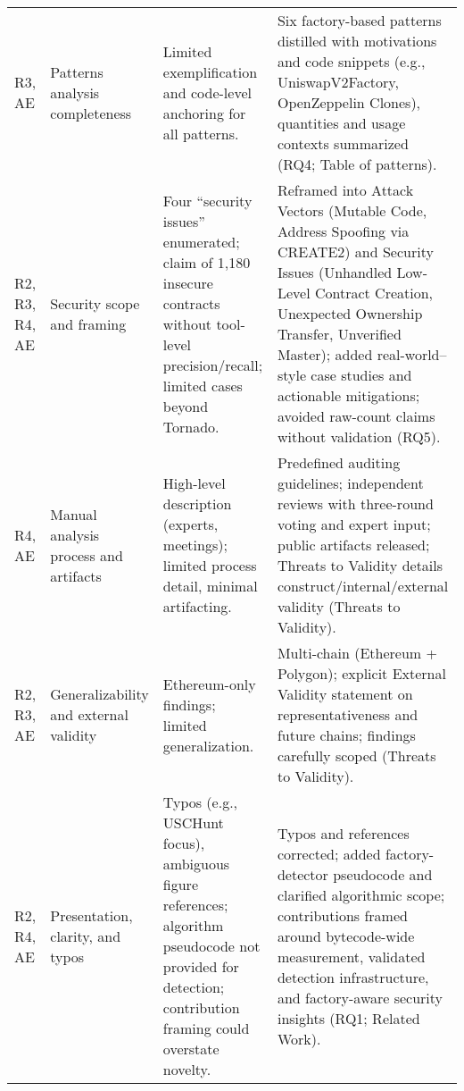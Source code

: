 \begin{table*}
\begin{tabular}{@{}p{1.6cm} p{2cm} p{3.8cm} p{5.5cm}@{}}
		R3, AE                  & Patterns analysis completeness          & Limited exemplification and code-level anchoring for all patterns.                                                                                       & Six factory-based patterns distilled with motivations and code snippets (e.g., UniswapV2Factory, OpenZeppelin Clones), quantities and usage contexts summarized (RQ4; Table of patterns).                                                                                                                   \\
		R2, R3, R4, AE          & Security scope and framing              & Four “security issues” enumerated; claim of 1,180 insecure contracts without tool-level precision/recall; limited cases beyond Tornado.                  & Reframed into Attack Vectors (Mutable Code, Address Spoofing via CREATE2) and Security Issues (Unhandled Low-Level Contract Creation, Unexpected Ownership Transfer, Unverified Master); added real-world–style case studies and actionable mitigations; avoided raw-count claims without validation (RQ5). \\
		R4, AE                  & Manual analysis process and artifacts   & High-level description (experts, meetings); limited process detail, minimal artifacting.                                                                 & Predefined auditing guidelines; independent reviews with three-round voting and expert input; public artifacts released; Threats to Validity details construct/internal/external validity (Threats to Validity).                                                                                            \\
		R2, R3, AE              & Generalizability and external validity  & Ethereum-only findings; limited generalization.                                                                                                          & Multi-chain (Ethereum + Polygon); explicit External Validity statement on representativeness and future chains; findings carefully scoped (Threats to Validity).                                                                                                                                            \\
		R2, R4, AE              & Presentation, clarity, and typos        & Typos (e.g., USCHunt focus), ambiguous figure references; algorithm pseudocode not provided for detection; contribution framing could overstate novelty. & Typos and references corrected; added factory-detector pseudocode and clarified algorithmic scope; contributions framed around bytecode-wide measurement, validated detection infrastructure, and factory-aware security insights (RQ1; Related Work).                                                      \\
		\bottomrule
	\end{tabular}
	\vspace{-0.4em}
\end{table*}
